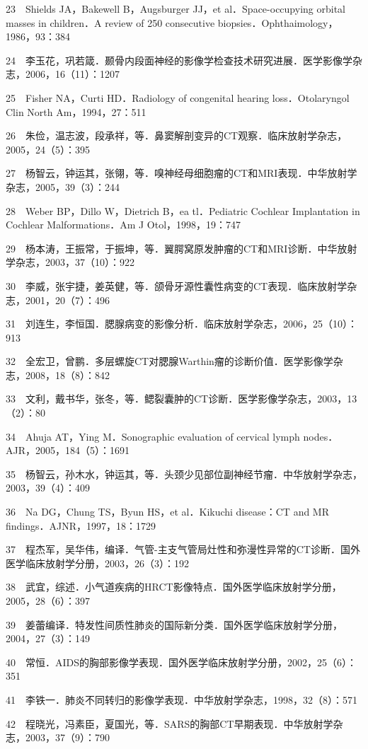 23　Shields JA，Bakewell B，Augsburger JJ，et al．Space-occupying
orbital masses in children．A review of 250 consecutive
biopsies．Ophthaimology，1986，93：384

24　李玉花，巩若箴．颞骨内段面神经的影像学检查技术研究进展．医学影像学杂志，2006，16（11）：1207

25　Fisher NA，Curti HD．Radiology of congenital hearing
loss．Otolaryngol Clin North Am，1994，27：511

26　朱俭，温志波，段承祥，等．鼻窦解剖变异的CT观察．临床放射学杂志，2005，24（5）：395

27　杨智云，钟运其，张翎，等．嗅神经母细胞瘤的CT和MRI表现．中华放射学杂志，2005，39（3）：244

28　Weber BP，Dillo W，Dietrich B，ea tl．Pediatric Cochlear
Implantation in Cochlear Malformations．Am J Otol，1998，19：747

29　杨本涛，王振常，于振坤，等．翼腭窝原发肿瘤的CT和MRI诊断．中华放射学杂志，2003，37（10）：922

30　李威，张宇捷，姜英健，等．颌骨牙源性囊性病变的CT表现．临床放射学杂志，2001，20（7）：496

31　刘连生，李恒国．腮腺病变的影像分析．临床放射学杂志，2006，25（10）：913

32　全宏卫，曾鹏．多层螺旋CT对腮腺Warthin瘤的诊断价值．医学影像学杂志，2008，18（8）：842

33　文利，戴书华，张冬，等．鳃裂囊肿的CT诊断．医学影像学杂志，2003，13（2）：80

34　Ahuja AT，Ying M．Sonographic evaluation of cervical lymph
nodes．AJR，2005，184（5）：1691

35　杨智云，孙木水，钟运其，等．头颈少见部位副神经节瘤．中华放射学杂志，2003，39（4）：409

36　Na DG，Chung TS，Byun HS，et al．Kikuchi disease：CT and MR
findings．AJNR，1997，18：1729

37　程杰军，吴华伟，编译．气管-主支气管局灶性和弥漫性异常的CT诊断．国外医学临床放射学分册，2003，26（3）：192

38　武宜，综述．小气道疾病的HRCT影像特点．国外医学临床放射学分册，2005，28（6）：397

39　姜蕾编译．特发性间质性肺炎的国际新分类．国外医学临床放射学分册，2004，27（3）：149

40　常恒．AIDS的胸部影像学表现．国外医学临床放射学分册，2002，25（6）：351

41　李铁一．肺炎不同转归的影像学表现．中华放射学杂志，1998，32（8）：571

42　程晓光，冯素臣，夏国光，等．SARS的胸部CT早期表现．中华放射学杂志，2003，37（9）：790

